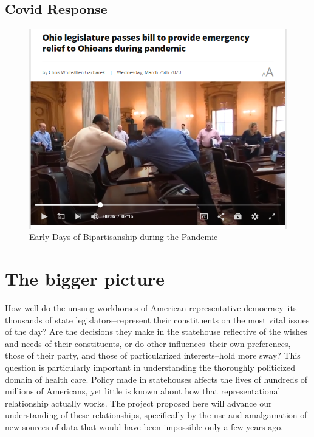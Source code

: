 \documentclass[
  oneside]{book}
\begin{document}
\hypertarget{covid-response}{%
\subsection{Covid Response}\label{covid-response}}

\begin{figure}
\includegraphics[width=0.99\linewidth]{Plots/Web/oh_legislature_covid_hb197} \caption{Early Days of Bipartisanship during the Pandemic}\label{fig:covid-oh}
\end{figure}

\hypertarget{the-bigger-picture}{%
\section{The bigger picture}\label{the-bigger-picture}}

How well do the unsung workhorses of American representative democracy--its thousands of state legislators--represent their constituents on the most vital issues of the day? Are the decisions they make in the statehouse reflective of the wishes and needs of their constituents, or do other influences--their own preferences, those of their party, and those of particularized interests--hold more sway? This question is particularly important in understanding the thoroughly politicized domain of health care. Policy made in statehouses affects the lives of hundreds of millions of Americans, yet little is known about how that representational relationship actually works. The project proposed here will advance our understanding of these relationships, specifically by the use and amalgamation of new sources of data that would have been impossible only a few years ago.
\end{document}
